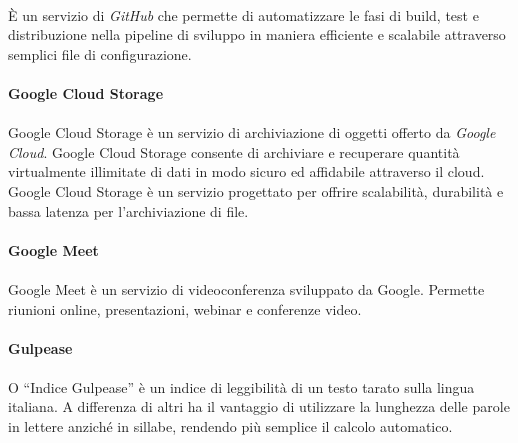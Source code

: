 \documentclass[10pt, a4paper]{article}
\begin{document}
\paragraph{}È un servizio di \textit{GitHub\pg} che permette di automatizzare le fasi di build, test e distribuzione nella pipeline di sviluppo in maniera efficiente e scalabile attraverso semplici file di configurazione.

\vspace{2em}
\paragraph{Google Cloud Storage}\noindent\hrulefill
\paragraph{}Google Cloud Storage è un servizio di archiviazione di oggetti offerto da \textit{Google Cloud\pg}. Google Cloud Storage consente di archiviare e recuperare quantità virtualmente illimitate di dati in modo sicuro ed affidabile attraverso il cloud. Google Cloud Storage è un servizio progettato per offrire scalabilità, durabilità e bassa latenza per l'archiviazione di file.

\vspace{2em}
\paragraph{Google Meet}\noindent\hrulefill
\paragraph{}Google Meet è un servizio di videoconferenza sviluppato da Google. Permette riunioni online, presentazioni, webinar e conferenze video.

\vspace{2em}
\paragraph{Gulpease}\noindent\hrulefill 
\paragraph{}O “Indice Gulpease” è un indice di leggibilità di un testo tarato sulla
lingua italiana. A differenza di altri ha il vantaggio di utilizzare la lunghezza delle
parole in lettere anziché in sillabe, rendendo più semplice il calcolo automatico.

\newpage
\end{document}
